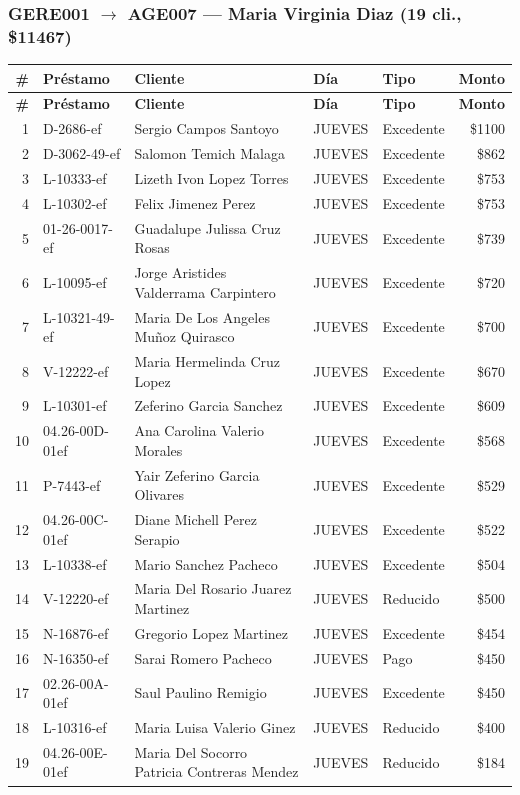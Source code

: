 \documentclass[11pt,a4paper]{article}
\newcommand{\money}[1]{\$\num{#1}}
\begin{document}
\subsubsection{GERE001 $\rightarrow$ AGE007 --- Maria Virginia Diaz (19 cli., \money{11467})}


\begin{center}
\renewcommand{\arraystretch}{1.1}
\footnotesize
\begin{longtable}{rlp{5.5cm}llr}
\toprule
\textbf{\#} & \textbf{Pr\'estamo} & \textbf{Cliente} & \textbf{D\'ia} & \textbf{Tipo} & \textbf{Monto} \\
\midrule
\endfirsthead
\toprule
\textbf{\#} & \textbf{Pr\'estamo} & \textbf{Cliente} & \textbf{D\'ia} & \textbf{Tipo} & \textbf{Monto} \\
\midrule
\endhead
1 & D-2686-ef & Sergio Campos Santoyo & JUEVES & Excedente & \money{1100} \\
2 & D-3062-49-ef & Salomon Temich Malaga & JUEVES & Excedente & \money{862} \\
3 & L-10333-ef & Lizeth Ivon Lopez Torres & JUEVES & Excedente & \money{753} \\
4 & L-10302-ef & Felix Jimenez Perez & JUEVES & Excedente & \money{753} \\
5 & 01-26-0017-ef & Guadalupe Julissa Cruz Rosas & JUEVES & Excedente & \money{739} \\
6 & L-10095-ef & Jorge Aristides Valderrama Carpintero & JUEVES & Excedente & \money{720} \\
7 & L-10321-49-ef & Maria De Los Angeles Muñoz Quirasco & JUEVES & Excedente & \money{700} \\
8 & V-12222-ef & Maria Hermelinda Cruz Lopez & JUEVES & Excedente & \money{670} \\
9 & L-10301-ef & Zeferino Garcia Sanchez & JUEVES & Excedente & \money{609} \\
10 & 04.26-00D-01ef & Ana Carolina Valerio Morales & JUEVES & Excedente & \money{568} \\
11 & P-7443-ef & Yair Zeferino Garcia Olivares & JUEVES & Excedente & \money{529} \\
12 & 04.26-00C-01ef & Diane Michell Perez Serapio & JUEVES & Excedente & \money{522} \\
13 & L-10338-ef & Mario Sanchez Pacheco & JUEVES & Excedente & \money{504} \\
14 & V-12220-ef & Maria Del Rosario Juarez Martinez & JUEVES & Reducido & \money{500} \\
15 & N-16876-ef & Gregorio Lopez Martinez & JUEVES & Excedente & \money{454} \\
16 & N-16350-ef & Sarai Romero Pacheco & JUEVES & Pago & \money{450} \\
17 & 02.26-00A-01ef & Saul Paulino Remigio & JUEVES & Excedente & \money{450} \\
18 & L-10316-ef & Maria Luisa Valerio Ginez & JUEVES & Reducido & \money{400} \\
19 & 04.26-00E-01ef & Maria Del Socorro Patricia Contreras Mendez & JUEVES & Reducido & \money{184} \\

\bottomrule
\end{longtable}
\end{center}
\end{document}
